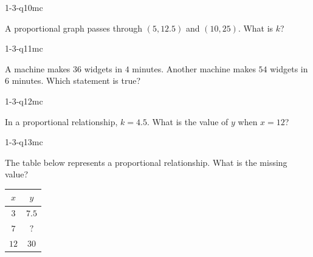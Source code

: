 \begin{practiceQuestion}{1-3-q10}{mc}
\begin{questionText}
A proportional graph passes through $(5, 12.5)$ and $(10, 25)$. What is $k$?
\end{questionText}
\end{practiceQuestion}

\begin{practiceQuestion}{1-3-q11}{mc}
\begin{questionText}
A machine makes $36$ widgets in $4$ minutes. Another machine makes $54$ widgets in $6$ minutes. Which statement is true?
\end{questionText}
\end{practiceQuestion}

\begin{practiceQuestion}{1-3-q12}{mc}
\begin{questionText}
In a proportional relationship, $k = 4.5$. What is the value of $y$ when $x = 12$?
\end{questionText}
\end{practiceQuestion}

\begin{practiceQuestion}{1-3-q13}{mc}
\begin{questionText}
The table below represents a proportional relationship. What is the missing value?

\begin{center}
\begin{tabular}{|c|c|}
\hline
$x$ & $y$ \\
\hline
$3$ & $7.5$ \\
$7$ & $?$ \\
$12$ & $30$ \\
\hline
\end{tabular}
\end{center}
\end{questionText}
\end{practiceQuestion}

